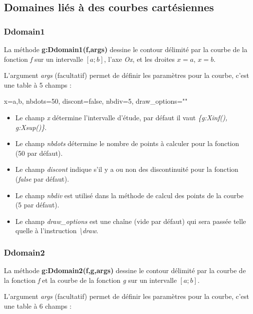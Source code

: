 \subsection{Domaines liés à des courbes cartésiennes}

\subsubsection{Ddomain1}

La méthode \textbf{g:Ddomain1(f,args)} dessine le contour délimité par la courbe de la fonction \emph{f} sur un intervalle \([a;b]\), l'axe \emph{Ox}, et les droites \(x=a\), \(x=b\).

L'argument \emph{args} (facultatif) permet de définir les paramètres pour la courbe, c'est une table à 5 champs : 

  \begin{TeXcode}
    { x={a,b},  nbdots=50, discont=false, nbdiv=5, draw_options="" }
  \end{TeXcode}
  
    \begin{itemize}
        \item Le champ \emph{x} détermine l'intervalle d'étude, par défaut il vaut \emph{\{g:Xinf(), g:Xsup()\}}.
        \item Le champ \emph{nbdots} détermine le nombre de points à calculer pour la fonction (50 par défaut).
        \item Le champ \emph{discont} indique s'il y a ou non des discontinuité pour la fonction (\emph{false} par défaut).
        \item Le champ \emph{nbdiv} est utilisé dans la méthode de calcul des points de la courbe (5 par défaut).
        \item Le champ \emph{draw\_options} est une chaîne (vide par défaut) qui sera passée telle quelle à l'instruction \emph{\textbackslash draw}.
  
    \end{itemize}
    
\subsubsection{Ddomain2}

La méthode \textbf{g:Ddomain2(f,g,args)} dessine le contour délimité par la courbe de la fonction \emph{f} et la courbe de la fonction \emph{g} sur un intervalle \([a;b]\).

L'argument \emph{args} (facultatif) permet de définir les paramètres pour la courbe, c'est une table à 6 champs : 

